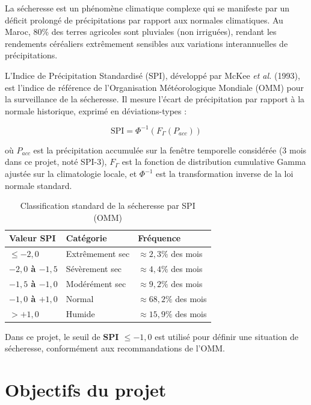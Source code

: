 \documentclass[12pt,a4paper]{report}
\begin{document}
La sécheresse est un phénomène climatique complexe qui se manifeste par un déficit prolongé de précipitations par rapport aux normales climatiques. Au Maroc, 80\% des terres agricoles sont pluviales (non irriguées), rendant les rendements céréaliers extrêmement sensibles aux variations interannuelles de précipitations.

L'Indice de Précipitation Standardisé (SPI), développé par McKee \textit{et al.} (1993), est l'indice de référence de l'Organisation Météorologique Mondiale (OMM) pour la surveillance de la sécheresse. Il mesure l'écart de précipitation par rapport à la normale historique, exprimé en déviations-types :

\begin{equation}
    \text{SPI} = \Phi^{-1}\!\left(F_\Gamma(P_{acc})\right)
\end{equation}

où $P_{acc}$ est la précipitation accumulée sur la fenêtre temporelle considérée (3 mois dans ce projet, noté SPI-3), $F_\Gamma$ est la fonction de distribution cumulative Gamma ajustée sur la climatologie locale, et $\Phi^{-1}$ est la transformation inverse de la loi normale standard.

\begin{table}[H]
    \centering
    \begin{tabular}{>{\bfseries}p{3.5cm}p{5cm}p{5cm}}
        \toprule
        Valeur SPI & Catégorie & Fréquence \\
        \midrule
        $\leq -2{,}0$ & Extrêmement sec & $\approx 2{,}3\%$ des mois \\
        $-2{,}0$ à $-1{,}5$ & Sévèrement sec & $\approx 4{,}4\%$ des mois \\
        $-1{,}5$ à $-1{,}0$ & Modérément sec & $\approx 9{,}2\%$ des mois \\
        $-1{,}0$ à $+1{,}0$ & Normal & $\approx 68{,}2\%$ des mois \\
        $> +1{,}0$ & Humide & $\approx 15{,}9\%$ des mois \\
        \bottomrule
    \end{tabular}
    \caption{Classification standard de la sécheresse par SPI (OMM)}
\end{table}

Dans ce projet, le seuil de \textbf{SPI $\leq -1{,}0$} est utilisé pour définir une situation de sécheresse, conformément aux recommandations de l'OMM.

\section{Objectifs du projet}
\end{document}
